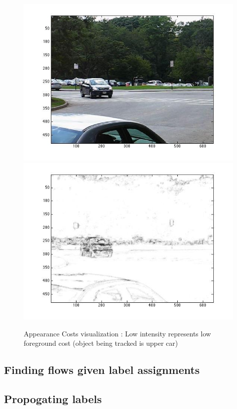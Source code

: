 \begin{figure}[H]
\begin{centering}
\includegraphics[scale=0.2]{figures/UnaryCostGT}\includegraphics[scale=0.2]{figures/UnaryCost}\caption{Appearance Costs visualization : Low intensity represents low foreground cost
(object being tracked is upper car)}

\par\end{centering}

\end{figure}



\subsection{Finding flows given label assignments}


\subsection{Propogating labels}